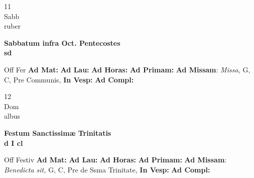 \documentclass[10pt, openany]{book}
\begin{document}
    \begin{center}
        \begin{minipage}{3.5in}
            \vspace{2em}
            \begin{minipage}{0.5in}
                {\Huge 11} \\
                {\normalsize Sabb} \\
                {\normalsize ruber}
            \end{minipage}
            \begin{minipage}{3.0in}
                \textbf{ \large Sabbatum infra Oct. Pentecostes \\
                \textnormal{\normalsize sd}} \\ 
            \end{minipage}
            \begin{justify}Off Fer
                \textbf{Ad Mat: }
                \textbf{Ad Lau: }
                \textbf{Ad Horas: }
                \textbf{Ad Primam: }\textbf{Ad Missam}: \textit{Missa,} G, C, Pre Communis,  
                \textbf{In Vesp: }
                \textbf{Ad Compl: }
            \end{justify}
        \end{minipage}
    \end{center}

    \begin{center}
        \begin{minipage}{3.5in}
            \vspace{2em}
            \begin{minipage}{0.5in}
                {\Huge 12} \\
                {\normalsize Dom} \\
                {\normalsize albus}
            \end{minipage}
            \begin{minipage}{3.0in}
                \textbf{ \large Festum Sanctissimæ Trinitatis \\
                \textnormal{\normalsize d I cl}} \\ 
            \end{minipage}
            \begin{justify}Off Festiv
                \textbf{Ad Mat: }
                \textbf{Ad Lau: }
                \textbf{Ad Horas: }
                \textbf{Ad Primam: }\textbf{Ad Missam}: \textit{Benedicta sit,} G, C, Pre de Ssma Trinitate,  
                \textbf{In Vesp: }
                \textbf{Ad Compl: }
            \end{justify}
        \end{minipage}
    \end{center}
\end{document}
